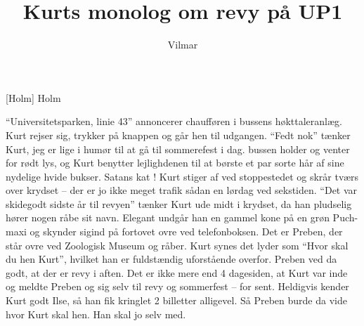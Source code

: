 \documentclass[a4paper,11pt]{article}
\title{Kurts monolog om revy på UP1}
\author{Vilmar}
\begin{document}
\maketitle

\begin{roles}
[Holm] Holm
\end{roles}

\begin{sketch}

``Universitetsparken, linie 43'' annoncerer chaufføren i bussens
høkttaleranlæg. Kurt rejser sig, trykker på knappen og går hen til
udgangen. ``Fedt nok'' tænker Kurt, jeg er lige i humør til at gå til
sommerefest i dag. bussen holder og venter for rødt lys, og Kurt benytter
lejlighdenen til at børste et par sorte hår af sine nydelige hvide
bukser. Satans kat ! Kurt stiger af ved stoppestedet og skrår tværs over krydset
-- der er jo ikke meget trafik sådan en lørdag ved sekstiden. ``Det var
skidegodt sidste år til revyen'' tænker Kurt ude midt i krydset, da han
pludselig hører nogen råbe sit navn. Elegant undgår han en gammel kone på en
grøn Puch-maxi og skynder sigind på fortovet ovre ved telefonboksen. Det er
Preben, der står ovre ved Zoologisk Museum og råber. Kurt synes det lyder som
``Hvor skal du hen Kurt'', hvilket han er fuldstændig uforstående
overfor. Preben ved da godt, at der er revy i aften. Det er ikke mere end 4
dagesiden, at Kurt var inde og meldte Preben og sig selv til revy og sommerfest
-- for sent. Heldigvis kender Kurt godt Ilse, så han fik kringlet 2 billetter
alligevel. Så Preben burde da vide hvor Kurt skal hen. Han skal jo selv med.


\end{sketch}
\end{document}
